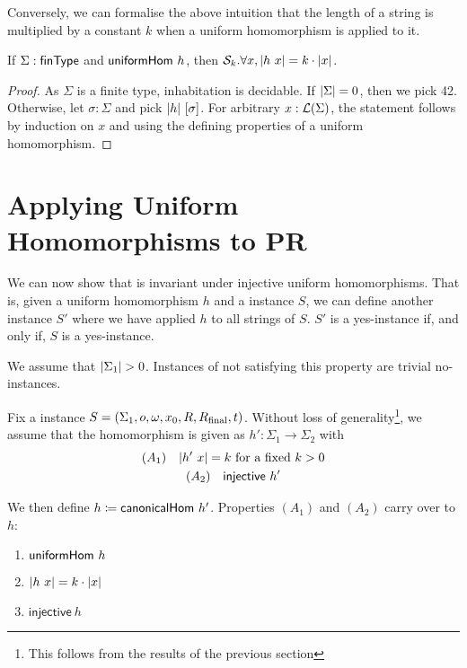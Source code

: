 Conversely, we can formalise the above intuition that the length of a string is multiplied by a constant $k$ when a uniform homomorphism is applied to it.
\begin{lemma}
  If $\Sigma : \textsf{finType}$ and $\textsf{uniformHom}~h$, then $\mathcal{S}_{k}. \forall x, |h~x| = k \cdot |x|$. 
\end{lemma}
\begin{proof}
  As $\Sigma$ is a finite type, inhabitation is decidable. If $|\Sigma| = 0$, then we pick 42. 
  Otherwise, let $\sigma : \Sigma$ and pick $|h|~[\sigma]$. 
  For arbitrary $x : \mathcal{L} (\Sigma)$, the statement follows by induction on $x$ and using the defining properties of a uniform homomorphism.
\end{proof}

\section{Applying Uniform Homomorphisms to PR}\label{sec:unif_hom_pr}
We can now show that \PR{} is invariant under injective uniform homomorphisms. That is, given a uniform homomorphism $h$ and a \PR{} instance $S$, we can define another \PR{} instance $S'$ where we have applied $h$ to all strings of $S$. $S'$ is a yes-instance if, and only if, $S$ is a yes-instance. 

We assume that $|\Sigma_1| > 0$. Instances of \PR{} not satisfying this property are trivial no-instances. 

Fix a \PR{} instance $S = (\Sigma_1, o, \omega, x_0, R, R_{\text{final}}, t)$. 
Without loss of generality\footnote{This follows from the results of the previous section}, we assume that the homomorphism is given as $h' : \Sigma_1 \rightarrow \Sigma_2$ with 
\begin{gather*}
  (A_1) \quad |h'~x| = k~\text{for a fixed } k > 0 \\
  (A_2) \quad \textsf{injective}~h'
\end{gather*}

We then define $h \coloneqq \textsf{canonicalHom}~h'$. 
Properties $(A_1)$ and $(A_2)$ carry over to $h$:
\begin{proposition}\label{prop:h_properties}
  \begin{enumerate}
    \item $\textsf{uniformHom}~h$
    \item $|h~x| = k \cdot |x|$
    \item $\textsf{injective}~h$
  \end{enumerate}
\end{proposition}

